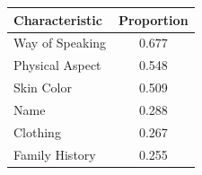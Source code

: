 \begin{tabular}{lc}
\toprule
Characteristic & Proportion \\
\midrule
Way of Speaking & 0.677 \\
Physical Aspect & 0.548 \\
Skin Color & 0.509 \\
Name & 0.288 \\
Clothing & 0.267 \\
Family History & 0.255 \\
\bottomrule
\end{tabular}
